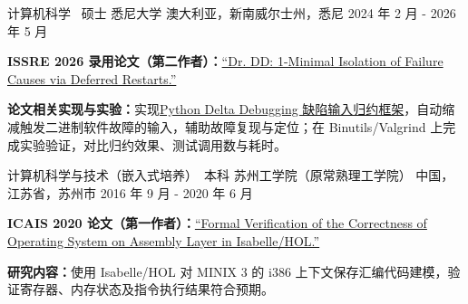 

\begin{cventries}

  \cventry
    {计算机科学 \textbar\ 硕士} %
    {悉尼大学} %
    {澳大利亚，新南威尔士州，悉尼} %
    {2024 年 2 月 - 2026 年 5 月} %
    {
      \begin{cvitems} %
        \item {\textbf{ISSRE 2026 录用论文（第二作者）：}\href{https://rahul.gopinath.org/publications/2026/07/11/drdd/}{``Dr. DD: 1-Minimal Isolation of Failure Causes via Deferred Restarts.''}}
        \item {\textbf{论文相关实现与实验：}实现\href{https://github.com/FreeFlyingSheep/delta-debugging}{Python Delta Debugging 缺陷输入归约框架}，自动缩减触发二进制软件故障的输入，辅助故障复现与定位；在 Binutils/Valgrind 上完成实验验证，对比归约效果、测试调用数与耗时。}
      \end{cvitems}
    }

  \cventry
    {计算机科学与技术（嵌入式培养）\textbar\ 本科} %
    {苏州工学院（原常熟理工学院）} %
    {中国，江苏省，苏州市} %
    {2016 年 9 月 - 2020 年 6 月} %
    {
      \begin{cvitems} %
        \item {\textbf{ICAIS 2020 论文（第一作者）：}\href{https://doi.org/10.1007/978-981-15-8083-3_25}{``Formal Verification of the Correctness of Operating System on Assembly Layer in Isabelle/HOL.''}}
        \item {\textbf{研究内容：}使用 Isabelle/HOL 对 MINIX 3 的 i386 上下文保存汇编代码建模，验证寄存器、内存状态及指令执行结果符合预期。}
      \end{cvitems}
    }

\end{cventries}
